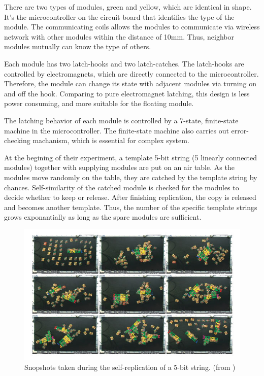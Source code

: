 \documentclass[12pt,twoside]{article}
\theoremstyle{plain}
\theoremstyle{definition}
\theoremstyle{remark}
\begin{document}
There are two types of modules, green and yellow, which are identical in shape. It's the microcontroller on the circuit board that identifies the type of the module. The communicating coils allows the modules to communicate via wireless network with other modules within the distance of 10mm. Thus, neighbor modules mutually can know the type of others. 

Each module has two latch-hooks and two latch-catches. The latch-hooks are controlled by electromagnets, which are directly connected to the microcontroller. Therefore, the module can change its state with adjacent modules via turning on and off the hook. Comparing to pure electromagnet latching, this design is less power consuming, and more suitable for the floating module. 

The latching behavior of each module is controlled by a 7-state, finite-state machine in the microcontroller. The finite-state machine also carries out error-checking machanism, which is essential for complex system.

At the begining of their experiment, a template 5-bit string (5 linearly connected modules) together with supplying modules are put on an air table. As the modules move randomly on the table, they are catched by the template string by chances. Self-similarity of the catched module is checked for the modules to decide whether to keep or release. After finishing replication, the copy is released and becomes another template. Thus, the number of the specific template strings grows exponantially as long as the spare modules are sufficient.

\begin{figure}[thbp]
	 \centerline{\includegraphics[width=1\textwidth]{griffith-1}}
	 {\caption{ Snopshots taken during the self-replication of a 5-bit string. (from \cite{griffith_self-replication_2005})}
	 \label{fig:gri-proc}}
\end{figure}
\end{document}
